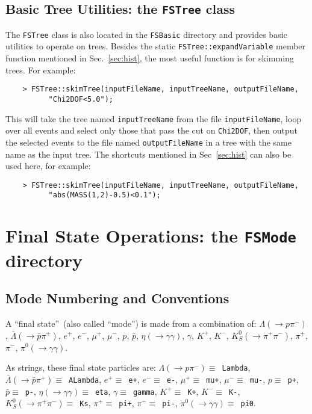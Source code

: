 \documentclass[11pt]{article}
\begin{document}
\subsection{Basic Tree Utilities: the {\tt FSTree} class}
\label{sec:tree}

The {\tt FSTree} class is also located in the {\tt FSBasic} directory and provides basic utilities to operate on trees.  
Besides the static {\tt FSTree::expandVariable} member function mentioned in Sec.~\ref{sec:hist}, the most useful function is for skimming trees.  For example:
\begin{verbatim}
    > FSTree::skimTree(inputFileName, inputTreeName, outputFileName,
          "Chi2DOF<5.0"); 
\end{verbatim}
This will take the tree named {\tt inputTreeName} from the file {\tt inputFileName}, loop over all events and select only those that pass the cut on {\tt Chi2DOF}, then output the selected events to the file named {\tt outputFileName} in a tree with the same name as the input tree.  The shortcuts mentioned in Sec~\ref{sec:hist} can also be used here, for example:
\begin{verbatim}
    > FSTree::skimTree(inputFileName, inputTreeName, outputFileName,
          "abs(MASS(1,2)-0.5)<0.1"); 
\end{verbatim}


\section{Final State Operations:  the {\tt FSMode} directory}
\label{sec:modes}

\subsection{Mode Numbering and Conventions}
\label{sec:modeconv}

A ``final state''~(also called ``mode'') is made from a combination of: $\Lambda (\to p \pi^-)$, $\bar{\Lambda} (\to \bar{p} \pi^+)$, $e^+$, $e^-$, $\mu^+$, $\mu^-$, $p$, $\bar{p}$, $\eta (\to \gamma\gamma)$, $\gamma$, $K^+$, $K^-$, $K^0_S (\to \pi^+\pi^-)$, $\pi^+$, $\pi^-$, $\pi^0 (\to \gamma\gamma)$.

As strings, these final state particles are:
$\Lambda (\to p \pi^-) \equiv $~{\tt Lambda}, 
$\bar{\Lambda} (\to \bar{p} \pi^+) \equiv $~{\tt ALambda}, 
$e^+ \equiv $~{\tt e+}, 
$e^- \equiv $~{\tt e-}, 
$\mu^+ \equiv $~{\tt mu+},  
$\mu^- \equiv $~{\tt mu-}, 
$p \equiv $~{\tt p+}, 
$\bar{p} \equiv $~{\tt p-}, 
$\eta (\to \gamma\gamma) \equiv $~{\tt eta}, 
$\gamma \equiv $~{\tt gamma}, 
$K^+ \equiv $~{\tt K+}, 
$K^- \equiv $~{\tt K-}, 
$K^0_S (\to \pi^+\pi^-) \equiv $~{\tt Ks}, 
$\pi^+ \equiv $~{\tt pi+}, 
$\pi^- \equiv $~{\tt pi-}, 
$\pi^0 (\to \gamma\gamma) \equiv $~{\tt pi0}.
\end{document}
